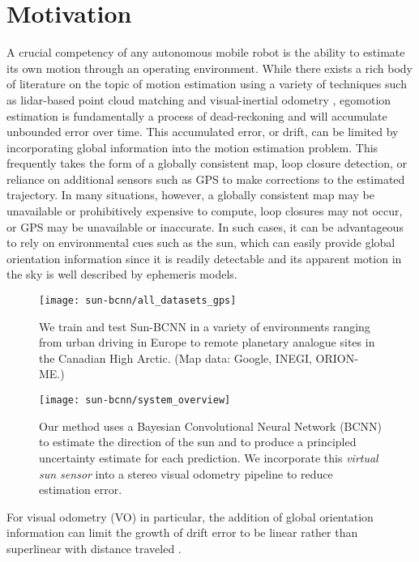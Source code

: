 \section{Motivation}
A crucial competency of any autonomous mobile robot is the ability to estimate its own motion through an operating environment.
While there exists a rich body of literature on the topic of motion estimation using a variety of techniques such as lidar-based point cloud matching \citep{Zhang2015} and visual-inertial odometry \citep{Leutenegger2015-fk}, egomotion estimation is fundamentally a process of dead-reckoning and will accumulate unbounded error over time.
This accumulated error, or drift, can be limited by incorporating global information into the motion estimation problem.
This frequently takes the form of a globally consistent map, loop closure detection, or reliance on additional sensors such as GPS to make corrections to the estimated trajectory.
In many situations, however, a globally consistent map may be unavailable or prohibitively expensive to compute, loop closures may not occur, or GPS may be unavailable or inaccurate.
In such cases, it can be advantageous to rely on environmental cues such as the sun, which can easily provide global orientation information since it is readily detectable and its apparent motion in the sky is well described by ephemeris models.


\begin{figure}
    \centering
    \texttt{[image: sun-bcnn/all\_datasets\_gps]}
    \caption{We train and test Sun-BCNN in a variety of environments ranging from urban driving in Europe to remote planetary analogue sites in the Canadian High Arctic. (Map data: Google, INEGI, ORION-ME.)}
    \label{fig:sun-bcnn_global-gps}
\end{figure}



\begin{wrapfigure}{r}{0.5\textwidth}
    \centering
      \texttt{[image: sun-bcnn/system\_overview]}
      \caption{Our method uses a Bayesian Convolutional Neural Network (BCNN) to estimate the direction of the sun and to produce a principled uncertainty estimate for each prediction. We incorporate this \emph{virtual sun sensor} into a stereo visual odometry pipeline to reduce estimation error.}
    \label{fig:sun-bcnn_system}
\end{wrapfigure}

For visual odometry (VO) in particular, the addition of global orientation information can limit the growth of drift error to be linear rather than superlinear with distance traveled \citep{Olson2003-ax}.


